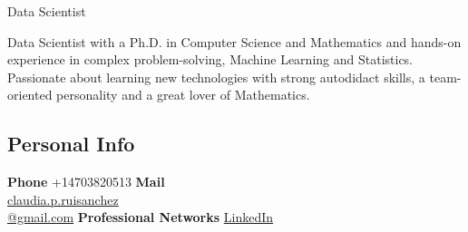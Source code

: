 \documentclass[]{friggeri-cv}
\begin{document}
      {Data Scientist}
      
 Data Scientist  with  a Ph.D. in Computer Science and Mathematics and  hands-on experience in complex problem-solving, Machine Learning and Statistics.  Passionate about learning new technologies with strong autodidact skills,  a team-oriented personality and a great lover of Mathematics. 


\begin{aside}
  \section{Personal Info}
  \textbf{Phone} +14703820513
  \textbf{Mail} \\\href{mailto:claudia.p.ruisanchez@gmail.com}{claudia.p.ruisanchez\\@gmail.com}
   \textbf{Professional Networks}
    \href{https://www.linkedin.com/in/claudiaperezruisanchez/}{LinkedIn}

\end{aside}
\end{document}
